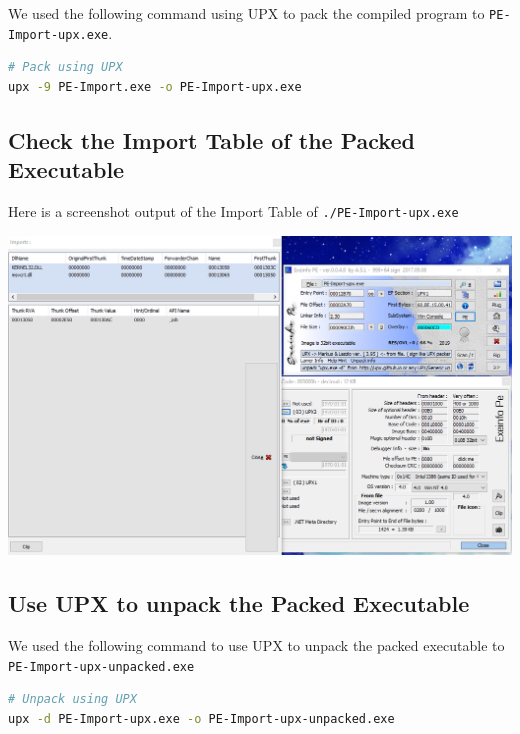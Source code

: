 \documentclass[11pt]{article}
\begin{document}
We used the following command using UPX to pack the compiled program to \lstinline{PE-Import-upx.exe}.

\begin{lstlisting}[language=bash]
# Pack using UPX
upx -9 PE-Import.exe -o PE-Import-upx.exe
\end{lstlisting}

\subsection{Check the Import Table of the Packed Executable}

Here is a screenshot output of the Import Table of \lstinline{./PE-Import-upx.exe} 
\begin{center}
    \includegraphics[width=\textwidth]{Assignment/2/Q1/sc_import_table_pe_upx.png}
\end{center}

\subsection{Use UPX to unpack the Packed Executable}

We used the following command to use UPX to unpack the packed executable to \lstinline{PE-Import-upx-unpacked.exe}
\begin{lstlisting}[language=bash]
# Unpack using UPX
upx -d PE-Import-upx.exe -o PE-Import-upx-unpacked.exe
\end{lstlisting}
\end{document}

